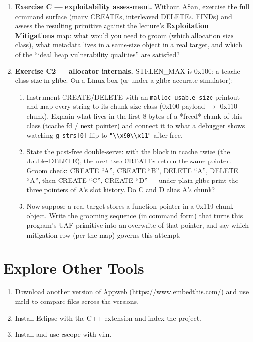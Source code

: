 \documentclass[12pt]{Training}
\begin{document}
\begin{enumerate}
    \item \textbf{Exercise C --- exploitability assessment.} Without ASan, exercise the full command surface (many CREATEs, interleaved DELETEs, FINDs) and assess the resulting primitive against the lecture's \textbf{Exploitation Mitigations} map: what would you need to groom (which allocation size class), what metadata lives in a same-size object in a real target, and which of the ``ideal heap vulnerability qualities'' are satisfied?
    \item \textbf{Exercise C2 --- allocator internals.} STRLEN\_MAX is 0x100: a tcache-class size in glibc. On a Linux box (or under a glibc-accurate simulator):
    \begin{enumerate}
        \item Instrument CREATE/DELETE with an \lstinline{malloc_usable_size} printout and map every string to its chunk size class (0x100 payload $\to$ 0x110 chunk). Explain what lives in the first 8 bytes of a *freed* chunk of this class (tcache fd / next pointer) and connect it to what a debugger shows watching \lstinline{g_strs[0]} flip to \lstinline{"\\x90\\x11"} after free.
        \item State the post-free double-serve: with the block in tcache twice (the double-DELETE), the next two CREATEs return the same pointer. Groom check: CREATE ``A'', CREATE ``B'', DELETE ``A'', DELETE ``A'', then CREATE ``C'', CREATE ``D'' --- under plain glibc print the three pointers of A's slot history. Do C and D alias A's chunk?
        \item Now suppose a real target stores a function pointer in a 0x110-chunk object. Write the grooming sequence (in command form) that turns this program's UAF primitive into an overwrite of that pointer, and say which mitigation row (per the map) governs this attempt.
    \end{enumerate}
\end{enumerate}

\section*{Explore Other Tools}
\begin{enumerate}
    \item Download another version of Appweb (https://www.embedthis.com/) and use meld to compare files across the versions.
    \item Install Eclipse with the C++ extension and index the project.
    \item Install and use cscope with vim.
\end{enumerate}
\end{document}
